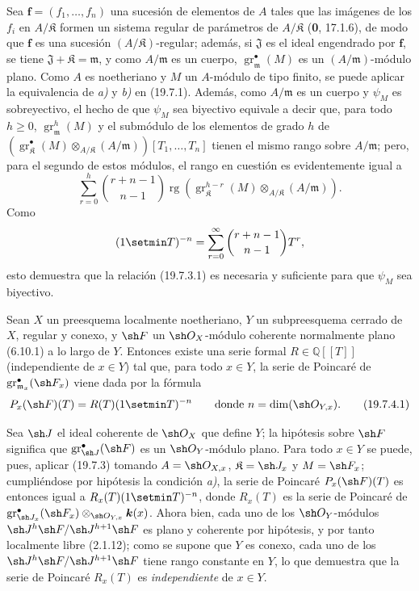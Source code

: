 Sea $\mathbf f=(f_1,\ldots,f_n)$ una sucesión de elementos de $A$ tales que las imágenes de los $f_i$ en $A/\mathfrak K$ formen un sistema regular de parámetros de $A/\mathfrak K$ (\textbf{0}, 17.1.6), de modo que $\mathbf f$ es una sucesión $(A/\mathfrak K)$-regular; además, si $\mathfrak J$ es el ideal engendrado por $\mathbf f$, se tiene $\mathfrak J+\mathfrak K=\mathfrak m$, y como $A/\mathfrak m$ es un cuerpo, $\operatorname{gr}_{\mathfrak m}^\bullet(M)$ es un $(A/\mathfrak m)$-módulo plano. Como $A$ es noetheriano y $M$ un $A$-módulo de tipo finito, se puede aplicar la equivalencia de \emph{a)} y \emph{b)} en (19.7.1). Además, como $A/\mathfrak m$ es un cuerpo y $\psi_M$ es sobreyectivo, el hecho de que $\psi_M$ sea biyectivo equivale a decir que, para todo $h\geq0$, $\operatorname{gr}_{\mathfrak m}^h(M)$ y el submódulo de los elementos de grado $h$ de $(\operatorname{gr}_{\mathfrak K}^\bullet(M)\otimes_{A/\mathfrak K}(A/\mathfrak m))[T_1,\ldots,T_n]$ tienen el mismo rango sobre $A/\mathfrak m$; pero, para el segundo de estos módulos, el rango en cuestión es evidentemente igual a
\[
  \sum_{r=0}^h\binom{r+n-1}{n-1}\operatorname{rg}(\operatorname{gr}_{\mathfrak K}^{h-r}(M)\otimes_{A/\mathfrak K}(A/\mathfrak m)).
\]
Como
\[
  (1\setmin T)^{-n}=\sum_{r=0}^{\infty}\binom{r+n-1}{n-1}T^r,
\]
esto demuestra que la relación (19.7.3.1) es necesaria y suficiente para que $\psi_M$ sea biyectivo.

\begin{corollary}[19.7.4]
\label{IV.19.7.4}
Sean $X$ un preesquema localmente noetheriano, $Y$ un subpreesquema cerrado de $X$, regular y conexo, y $\sh F$ un $\sh O_X$-módulo coherente normalmente plano \textup{(6.10.1)} a lo largo de $Y$. Entonces existe una serie formal $R\in\mathbb{Q}[[T]]$ \textup{(independiente de $x\in Y$)} tal que, para todo $x\in Y$, la serie de Poincaré de $\operatorname{gr}_{\mathfrak m_x}^\bullet(\sh F_x)$ viene dada por la fórmula
\begin{equation}
  P_x(\sh F)(T)=R(T)(1\setmin T)^{-n}\qquad\text{donde }n=\dim(\sh O_{Y,x}).
  \tag{19.7.4.1}\label{IV.19.7.4.1}
\end{equation}
\end{corollary}


Sea $\sh J$ el ideal coherente de $\sh O_X$ que define $Y$; la hipótesis sobre $\sh F$ significa que $\operatorname{gr}_{\sh J}^\bullet(\sh F)$ es un $\sh O_Y$-módulo plano. Para todo $x\in Y$ se puede, pues, aplicar (19.7.3) tomando $A=\sh O_{X,x}$, $\mathfrak K=\sh J_x$ y $M=\sh F_x$; cumpliéndose por hipótesis la condición \emph{a)}, la serie de Poincaré $P_x(\sh F)(T)$ es entonces igual a $R_x(T)(1\setmin T)^{-n}$, donde $R_x(T)$ es la serie de Poincaré de $\operatorname{gr}_{\sh J_x}^\bullet(\sh F_x)\otimes_{\sh O_{Y,x}}\boldsymbol k(x)$. Ahora bien, cada uno de los $\sh O_Y$-módulos $\sh J^h\sh F/\sh J^{h+1}\sh F$ es plano y coherente por hipótesis, y por tanto localmente libre (2.1.12); como se supone que $Y$ es conexo, cada uno de los $\sh J^h\sh F/\sh J^{h+1}\sh F$ tiene rango constante en $Y$, lo que demuestra que la serie de Poincaré $R_x(T)$ es \emph{independiente} de $x\in Y$.

